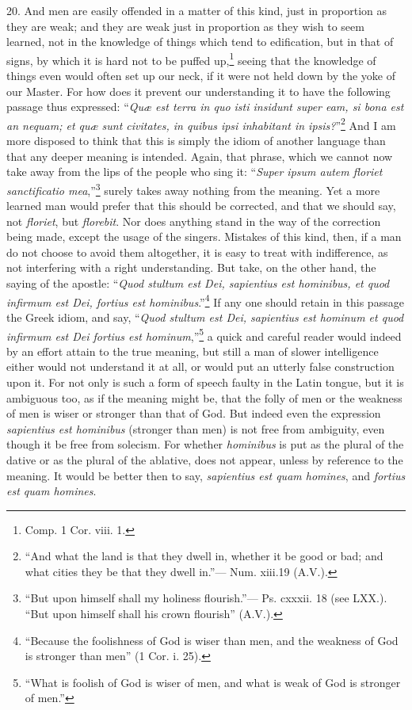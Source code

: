 20. And men are easily offended in a matter of this kind, just in proportion as they are weak; and they are weak just in proportion as they wish to seem learned, not in the knowledge of things which tend to edification, but in that of signs, by which it is hard not to be puffed up,\footnote{Comp. 1 Cor. viii. 1.} seeing that the knowledge of things even would often set up our neck, if it were not held down by the yoke of our Master. For how does it prevent our understanding it to have the following passage thus expressed: “\emph{Quæ est terra in quo isti insidunt super eam, si bona est an nequam; et quæ sunt civitates, in quibus ipsi inhabitant in ipsis?}”\footnote{“And what the land is that they dwell in, whether it be good or bad; and what cities they be that they dwell in.”— Num. xiii.19 (A.V.).} And I am more disposed to think that this is simply the idiom of another language than that any deeper meaning is intended. Again, that phrase, which we cannot now take away from the lips of the people who sing it: “\emph{Super ipsum autem floriet sanctificatio mea},”\footnote{“But upon himself shall my holiness flourish.”— Ps. cxxxii. 18 (see LXX.). “But upon himself shall his crown flourish” (A.V.).} surely takes away nothing from the meaning. Yet a more learned man would prefer that this should be corrected, and that we should say, not \emph{floriet}, but \emph{florebit}. Nor does anything stand in the way of the correction being made, except the usage of the singers. Mistakes of this kind, then, if a man do not choose to avoid them altogether, it is easy to treat with indifference, as not interfering with a right understanding. But take, on the other hand, the saying of the apostle: “\emph{Quod stultum est Dei, sapientius est hominibus, et quod infirmum est Dei, fortius est hominibus}.”\footnote{“Because the foolishness of God is wiser than men, and the weakness of God is stronger than men” (1 Cor. i. 25).} If any one should retain in this passage the Greek idiom, and say, “\emph{Quod stultum est Dei, sapientius est hominum et quod infirmum est Dei fortius est hominum},”\footnote{“What is foolish of God is wiser of men, and what is weak of God is stronger of men.”} a quick and careful reader would indeed by an effort attain to the true meaning, but still a man of slower intelligence either would not understand it at all, or would put an utterly false construction upon it. For not only is such a form of speech  faulty in the Latin tongue, but it is ambiguous too, as if the meaning might be, that the folly of men or the weakness of men is wiser or stronger than that of God. But indeed even the expression \emph{ sapientius est hominibus} (stronger than men) is not free from ambiguity, even though it be free from solecism. For whether \emph{ hominibus} is put as the plural of the dative or as the plural of the ablative, does not appear, unless by reference to the meaning. It would be better then to say, \emph{sapientius est quam homines}, and \emph{fortius est quam homines}.

